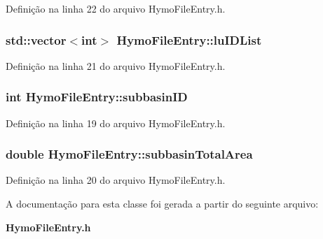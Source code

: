 Definição na linha 22 do arquivo Hymo\+File\+Entry.\+h.

\subsubsection[{lu\+I\+D\+List}]{\setlength{\rightskip}{0pt plus 5cm}std\+::vector$<$int$>$ Hymo\+File\+Entry\+::lu\+I\+D\+List\hspace{0.3cm}{\ttfamily [protected]}}\label{class_hymo_file_entry_aaf68a67adf2dabf65d746ff5475c3dca}


Definição na linha 21 do arquivo Hymo\+File\+Entry.\+h.

\subsubsection[{subbasin\+ID}]{\setlength{\rightskip}{0pt plus 5cm}int Hymo\+File\+Entry\+::subbasin\+ID\hspace{0.3cm}{\ttfamily [protected]}}\label{class_hymo_file_entry_ab56abacf94395c9eacb3f13cdd413233}


Definição na linha 19 do arquivo Hymo\+File\+Entry.\+h.

\subsubsection[{subbasin\+Total\+Area}]{\setlength{\rightskip}{0pt plus 5cm}double Hymo\+File\+Entry\+::subbasin\+Total\+Area\hspace{0.3cm}{\ttfamily [protected]}}\label{class_hymo_file_entry_a364f54f0303d2760278475396df6aef4}


Definição na linha 20 do arquivo Hymo\+File\+Entry.\+h.



A documentação para esta classe foi gerada a partir do seguinte arquivo\+:\begin{DoxyCompactItemize}
\item 
{\bf Hymo\+File\+Entry.\+h}\end{DoxyCompactItemize}
